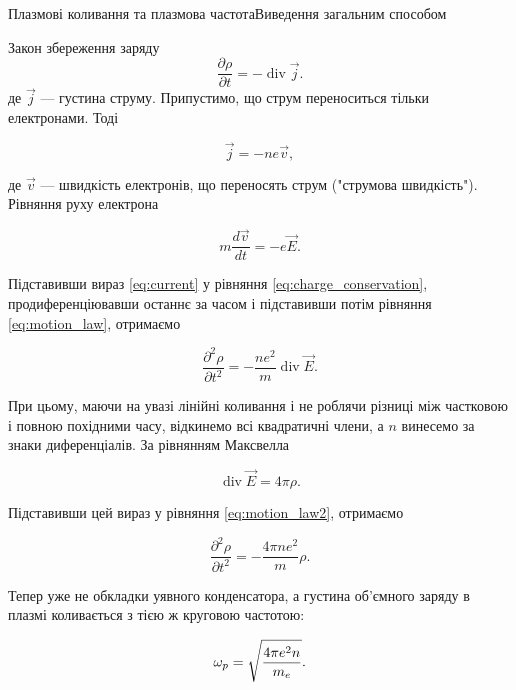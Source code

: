 \documentclass[]{beamer}
\begin{document}
\begin{frame}{Плазмові коливання та плазмова частота}{Виведення загальним способом}
	\renewcommand{\baselinestretch}{0.85}
	\begin{block}{}\justifying\tiny
		Закон збереження заряду
		\begin{equation}\label{eq:charge_conservation}
			\frac{\partial \rho}{\partial t}  = - \operatorname{div}\vec{j}.
		\end{equation}
		де $\vec{j}$ --- густина струму. Припустимо, що струм переноситься тільки електронами. Тоді

		\begin{equation}\label{eq:current}
			\vec{j}  = - ne\vec{v},
		\end{equation}

		де $\vec{v}$ --- швидкість електронів, що переносять струм ("струмова швидкість"). Рівняння
		руху електрона

		\begin{equation}\label{eq:motion_law}
			m\frac{d\vec{v}}{dt} = -e\vec{E}.
		\end{equation}

		Підставивши вираз \eqref{eq:current} у рівняння \eqref{eq:charge_conservation}, продиференціювавши останнє за часом і підставивши потім рівняння \eqref{eq:motion_law}, отримаємо

		\begin{equation}\label{eq:motion_law2}
			\frac{\partial^2 \rho}{\partial t^2}  = - \frac{ne^2}{m}\operatorname{div}\vec{E}.
		\end{equation}

		При цьому, маючи на увазі лінійні коливання і не роблячи різниці між частковою і повною похідними часу, відкинемо всі квадратичні члени, а $n$ винесемо за знаки диференціалів. За рівнянням Максвелла

		\begin{equation}
			\operatorname{div}\vec{E} = 4\pi \rho.
		\end{equation}

		Підставивши цей вираз у рівняння \eqref{eq:motion_law2}, отримаємо

		\begin{equation}
			\frac{\partial^2 \rho}{\partial t^2}  = - \frac{4\pi ne^2}{m}\rho.
		\end{equation}

		Тепер уже не обкладки уявного конденсатора, а густина об'ємного заряду в плазмі коливається з тією ж круговою частотою:

		\begin{equation*}
			\omega_p = \sqrt{\frac{4\pi e^2n}{m_e}} .
		\end{equation*}
	\end{block}
\end{frame}
\end{document}
